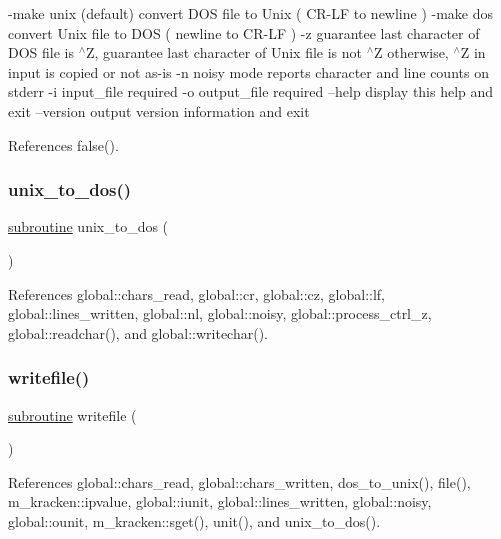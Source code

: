 -\/make unix (default) convert D\+OS file to Unix ( C\+R-\/\+LF to newline ) -\/make dos convert Unix file to D\+OS ( newline to C\+R-\/\+LF ) -\/z guarantee last character of D\+OS file is $^\wedge$Z, guarantee last character of Unix file is not $^\wedge$Z otherwise, $^\wedge$Z in input is copied or not as-\/is -\/n noisy mode reports character and line counts on stderr -\/i input\+\_\+file required -\/o output\+\_\+file required --help display this help and exit --version output version information and exit 

References false().

\mbox{\label{dtu_8f90_aaa5cd93a63e974bc45e4a6e2d6537ded}} 
\subsubsection{\texorpdfstring{unix\+\_\+to\+\_\+dos()}{unix\_to\_dos()}}
{\footnotesize\ttfamily \hyperlink{M__stopwatch_83_8txt_acfbcff50169d691ff02d4a123ed70482}{subroutine} unix\+\_\+to\+\_\+dos (\begin{DoxyParamCaption}{ }\end{DoxyParamCaption})}



References global\+::chars\+\_\+read, global\+::cr, global\+::cz, global\+::lf, global\+::lines\+\_\+written, global\+::nl, global\+::noisy, global\+::process\+\_\+ctrl\+\_\+z, global\+::readchar(), and global\+::writechar().

\mbox{\label{dtu_8f90_a6431a93cf13a3651f17078298d2d2ef9}} 
\subsubsection{\texorpdfstring{writefile()}{writefile()}}
{\footnotesize\ttfamily \hyperlink{M__stopwatch_83_8txt_acfbcff50169d691ff02d4a123ed70482}{subroutine} writefile (\begin{DoxyParamCaption}{ }\end{DoxyParamCaption})}



References global\+::chars\+\_\+read, global\+::chars\+\_\+written, dos\+\_\+to\+\_\+unix(), file(), m\+\_\+kracken\+::ipvalue, global\+::iunit, global\+::lines\+\_\+written, global\+::noisy, global\+::ounit, m\+\_\+kracken\+::sget(), unit(), and unix\+\_\+to\+\_\+dos().

